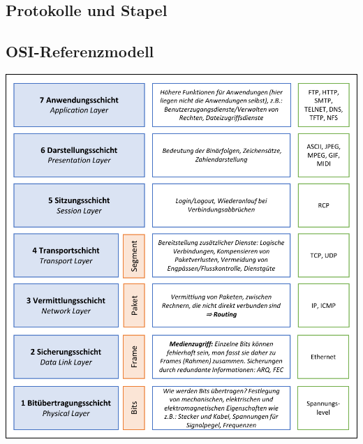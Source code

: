 \documentclass
[
	8pt,		%
	ngerman,	%
	a4paper,	%
	landscape,	%
	final		%
]{extarticle}
\begin{document}
\begin{multicols*}{4}
\section{Protokolle und Stapel}
\subsection{OSI-Referenzmodell}
\begin{center}
	\includegraphics[width=\linewidth]{Documents/OSI.pdf}
\end{center}

\end{multicols*}
\end{document}

